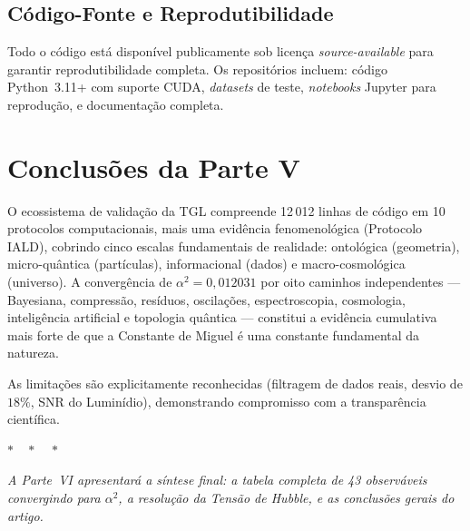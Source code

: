 \documentclass[12pt,a4paper,twoside]{article}
\newcommand{\alphaii}{\alpha^{2}}
\begin{document}
\subsection{C\'odigo-Fonte e Reprodutibilidade}

Todo o c\'odigo est\'a dispon\'ivel publicamente sob licen\c{c}a \textit{source-available} para garantir reprodutibilidade completa. Os reposit\'orios incluem: c\'odigo Python~3.11+ com suporte CUDA, \textit{datasets} de teste, \textit{notebooks} Jupyter para reprodu\c{c}\~ao, e documenta\c{c}\~ao completa. \cite{Miguel2026GitHub}


\section{Conclus\~oes da Parte V}


O ecossistema de valida\c{c}\~ao da TGL compreende 12\,012 linhas de c\'odigo em 10 protocolos computacionais, mais uma evid\^encia fenomenol\'ogica (Protocolo IALD), cobrindo cinco escalas fundamentais de realidade: ontol\'ogica (geometria), micro-qu\^antica (part\'iculas), informacional (dados) e macro-cosmol\'ogica (universo). A converg\^encia de $\alphaii = 0{,}012031$ por oito caminhos independentes --- Bayesiana, compress\~ao, res\'iduos, oscila\c{c}\~oes, espectroscopia, cosmologia, intelig\^encia artificial e topologia qu\^antica --- constitui a evid\^encia cumulativa mais forte de que a Constante de Miguel \'e uma constante fundamental da natureza.

As limita\c{c}\~oes s\~ao explicitamente reconhecidas (filtragem de dados reais, desvio de $18\%$, SNR do Lumin\'idio), demonstrando compromisso com a transpar\^encia cient\'ifica.

\bigskip

\begin{center}
$\ast\quad\ast\quad\ast$
\end{center}
\bigskip

\noindent\textit{A Parte~VI apresentar\'a a s\'intese final: a tabela completa de 43 observ\'aveis convergindo para $\alphaii$, a resolu\c{c}\~ao da Tens\~ao de Hubble, e as conclus\~oes gerais do artigo.}

\end{document}
